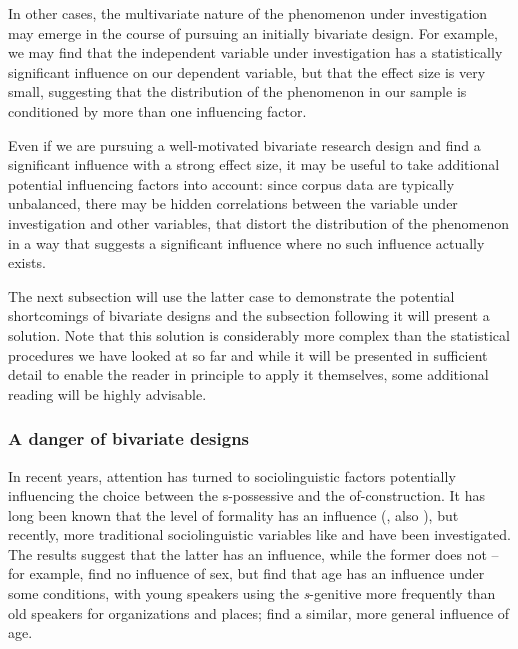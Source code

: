 In other cases, the multivariate  nature of the phenomenon under investigation may emerge in the course of pursuing an initially bivariate  design.  For example, we may find that the independent variable under investigation has a statistically significant  influence on our dependent variable, but that the effect size  is very small, suggesting that the distribution  of the phenomenon in our sample is conditioned by more than one influencing factor.

Even if we are pursuing a well\hyp{}motivated bivariate  research design  and find a significant  influence with a strong effect size,  it may be useful to take additional potential influencing factors into account: since corpus data are typically unbalanced, there may be hidden correlations  between the variable under investigation and other variables, that distort the distribution  of the phenomenon in a way that suggests a significant influence where no such influence actually exists.

The next subsection will use the latter case to demonstrate the potential shortcomings of bivariate  designs  and the subsection following it will present a solution. Note that this solution is considerably more complex than the statistical procedures we have looked at so far and while it will be presented in sufficient detail to enable the reader in principle to apply it themselves, some additional reading will be highly advisable.

\subsubsection{A danger of bivariate designs}

In recent years, attention has turned to sociolinguistic  factors potentially influencing the choice between the {s}-possessive  and the {of}-construction. It has long been known that the level of formality has an influence (\citealt{jucker_genitive_1993}, also \citealt{grafmiller_variation_2014}), but recently, more traditional sociolinguistic  variables like  and  have been investigated. The results suggest that the latter has an influence, while the former does not -- for example, \citet{jankowski_genitives_2014} find no influence of sex, but find that age  has an influence under some conditions, with young speakers using the \textit{s}-genitive more frequently than old speakers for organizations and places; \citet{vogel_rhythms_2015} find a similar, more general influence of  age.

